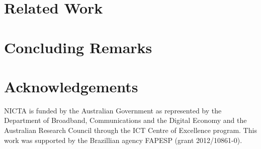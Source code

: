 \documentclass[]{article}
\begin{document}


\section{Related Work}



\section{Concluding Remarks}



\section*{Acknowledgements}
NICTA is funded by the
 Australian Government as represented by
the Department of Broadband, Communications and the Digital
Economy and the Australian Research Council through the ICT
Centre of Excellence program. This work was supported by 
the Brazillian agency FAPESP (grant 2012/10861-0).




\end{document}
